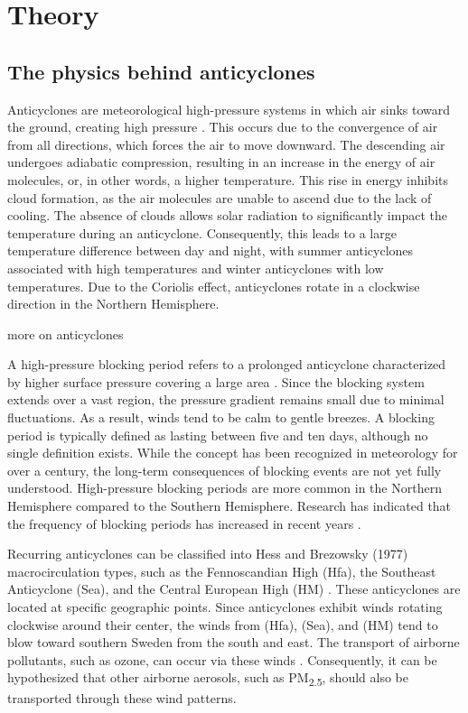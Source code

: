 \section{Theory}
\subsection{The physics behind anticyclones}
Anticyclones are meteorological high-pressure systems in which air sinks toward the ground, creating high pressure \cite{spiridonovCyclonesAnticyclonesSpringerLink2020}. This occurs due to the convergence of air from all directions, which forces the air to move downward. The descending air undergoes adiabatic compression, resulting in an increase in the energy of air molecules, or, in other words, a higher temperature. This rise in energy inhibits cloud formation, as the air molecules are unable to ascend due to the lack of cooling. The absence of clouds allows solar radiation to significantly impact the temperature during an anticyclone. Consequently, this leads to a large temperature difference between day and night, with summer anticyclones associated with high temperatures and winter anticyclones with low temperatures. Due to the Coriolis effect, anticyclones rotate in a clockwise direction in the Northern Hemisphere.

more on anticyclones

A high-pressure blocking period refers to a prolonged anticyclone characterized by higher surface pressure covering a large area \cite{lupoAtmosphericBlockingEvents2020}. Since the blocking system extends over a vast region, the pressure gradient remains small due to minimal fluctuations. As a result, winds tend to be calm to gentle breezes. A blocking period is typically defined as lasting between five and ten days, although no single definition exists. While the concept has been recognized in meteorology for over a century, the long-term consequences of blocking events are not yet fully understood. High-pressure blocking periods are more common in the Northern Hemisphere compared to the Southern Hemisphere. Research has indicated that the frequency of blocking periods has increased in recent years \cite{lupoAtmosphericBlockingEvents2020}. 

Recurring anticyclones can be classified into Hess and Brezowsky (1977) macrocirculation types, such as the Fennoscandian High (Hfa), the Southeast Anticyclone (Sea), and the Central European High (HM) \cite{bartholyEuropeanCycloneTrack2006}. These anticyclones are located at specific geographic points. Since anticyclones exhibit winds rotating clockwise around their center, the winds from (Hfa), (Sea), and (HM) tend to blow toward southern Sweden from the south and east. The transport of airborne pollutants, such as ozone, can occur via these winds \cite{oteroImpactAtmosphericBlocking2022}. Consequently, it can be hypothesized that other airborne aerosols, such as PM\textsubscript{2.5}, should also be transported through these wind patterns.

